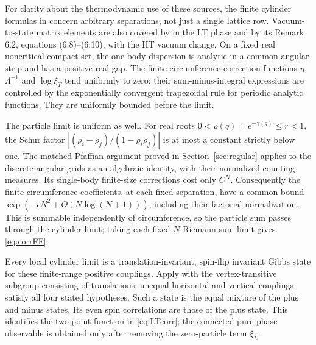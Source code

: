 \documentclass[11pt]{article}
\numberwithin{equation}{section}
\theoremstyle{definition}
\begin{document}
For clarity about the thermodynamic use of these sources, the finite
cylinder formulas in \cite[(35)--(39)]{BL} concern arbitrary separations,
not just a single lattice row. Vacuum-to-state matrix elements are also
covered by \cite[Theorem 6.1]{IL} in the LT phase and by its
Remark 6.2, equations (6.8)--(6.10), with the HT vacuum change.
On a fixed real noncritical compact set, the one-body dispersion is
analytic in a common angular strip and has a positive real gap. The
finite-circumference correction functions $\eta$, $\Lambda^{-1}$ and
$\log\xi_T$ tend uniformly to zero: their sum-minus-integral expressions
are controlled by the exponentially convergent trapezoidal rule for
periodic analytic functions. They are uniformly bounded before the limit.

The particle limit is uniform as well. For real roots
$0<\rho(q)=e^{-\gamma(q)}\le r<1$, the Schur factor
$|(\rho_i-\rho_j)/(1-\rho_i\rho_j)|$ is at most a constant strictly below
one. The matched-Pfaffian argument proved in
Section~\ref{sec:regular} applies to the discrete angular grids as an
algebraic identity, with their normalized counting measures. Its
single-body finite-size corrections cost only $C^N$. Consequently the
finite-circumference coefficients, at each fixed separation, have a
common bound $\exp(-cN^2+O(N\log(N+1)))$, including their factorial
normalization. This is summable independently of circumference, so the
particle sum passes through the cylinder limit; taking each fixed-$N$
Riemann-sum limit gives \eqref{eq:corrFF}.

Every local cylinder limit is a translation-invariant, spin-flip invariant
Gibbs state for these finite-range positive couplings. Apply
\cite[Theorem 1]{Raoufi} with the vertex-transitive subgroup consisting
of translations: unequal horizontal and vertical couplings satisfy all
four stated hypotheses. Such a state is the equal mixture of the plus
and minus states. Its even spin correlations are those of the plus
state. This identifies the two-point function in \eqref{eq:LTcorr};
the connected pure-phase observable is obtained only after removing
the zero-particle term $\xi_L$.
\end{document}
